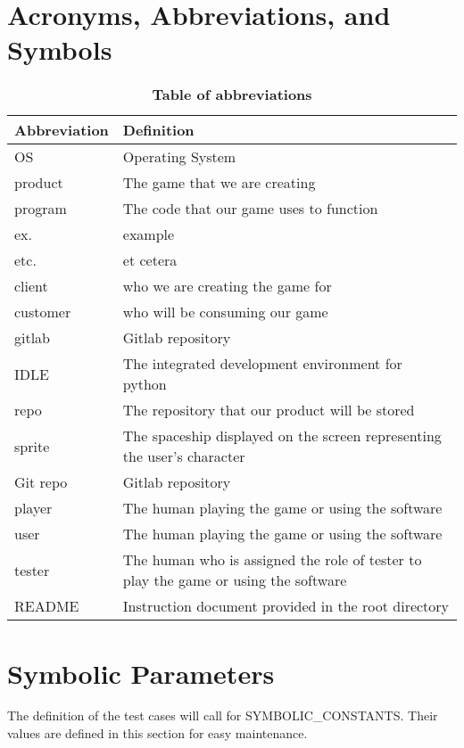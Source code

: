 \documentclass[12pt, titlepage]{article}
\begin{document}
\section{Acronyms, Abbreviations, and Symbols}
    
\begin{table}[H]
\caption{\textbf{Table of abbreviations}} \label{Table}
\begin{tabularx}{\textwidth}{p{3cm}X}
\toprule
\textbf{Abbreviation} & \textbf{Definition} \\
\midrule
OS &  Operating System  \\ \hline
 product & The game that we are creating   \\ \hline
 program & The code that our game uses to function   \\ \hline
 ex. & example \\ \hline
 etc. & et cetera \\ \hline
 client & who we are creating the game for \\ \hline
 customer & who will be consuming our game \\ \hline
 gitlab & Gitlab repository \\ \hline
 IDLE & The integrated development environment for python \\ \hline
 repo & The repository that our product will be stored \\ \hline
sprite &  The spaceship displayed on the screen representing the user's character \\ \hline
 Git repo&  Gitlab repository \\ \hline
player &  The human playing the game or using the software\\ \hline
user &  The human playing the game or using the software\\ \hline
tester & The human who is assigned the role of tester to play the game or using the software\\ \hline
 README & Instruction document provided in the root directory \\
\bottomrule
\end{tabularx}

\end{table}

\section{Symbolic Parameters}

The definition of the test cases will call for SYMBOLIC\_CONSTANTS.
Their values are defined in this section for easy maintenance.
    
\end{document}
